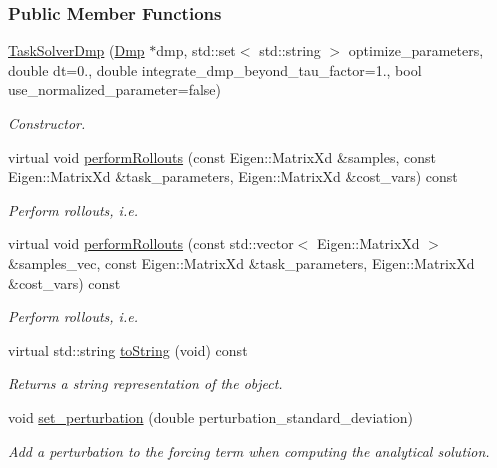 \subsubsection*{Public Member Functions}
\begin{DoxyCompactItemize}
\item 
\hyperlink{classDmpBbo_1_1TaskSolverDmp_a9038769df4b3b779070d4453dba1e2e8}{Task\+Solver\+Dmp} (\hyperlink{classDmpBbo_1_1Dmp}{Dmp} $\ast$dmp, std\+::set$<$ std\+::string $>$ optimize\+\_\+parameters, double dt=0., double integrate\+\_\+dmp\+\_\+beyond\+\_\+tau\+\_\+factor=1., bool use\+\_\+normalized\+\_\+parameter=false)
\begin{DoxyCompactList}\small\item\em Constructor. \end{DoxyCompactList}\item 
virtual void \hyperlink{classDmpBbo_1_1TaskSolverDmp_a1bfa5f861b08d1073a5c4461aefd7e57}{perform\+Rollouts} (const Eigen\+::\+Matrix\+Xd \&samples, const Eigen\+::\+Matrix\+Xd \&task\+\_\+parameters, Eigen\+::\+Matrix\+Xd \&cost\+\_\+vars) const 
\begin{DoxyCompactList}\small\item\em Perform rollouts, i.\+e. \end{DoxyCompactList}\item 
virtual void \hyperlink{classDmpBbo_1_1TaskSolverDmp_aef8605bc2d34bea9994507202e0368c2}{perform\+Rollouts} (const std\+::vector$<$ Eigen\+::\+Matrix\+Xd $>$ \&samples\+\_\+vec, const Eigen\+::\+Matrix\+Xd \&task\+\_\+parameters, Eigen\+::\+Matrix\+Xd \&cost\+\_\+vars) const 
\begin{DoxyCompactList}\small\item\em Perform rollouts, i.\+e. \end{DoxyCompactList}\item 
virtual std\+::string \hyperlink{classDmpBbo_1_1TaskSolverDmp_a1aca816b42cf0d36118be0ab91120d77}{to\+String} (void) const 
\begin{DoxyCompactList}\small\item\em Returns a string representation of the object. \end{DoxyCompactList}\item 
void \hyperlink{classDmpBbo_1_1TaskSolverDmp_a8abd9d1a1f4d871e203818298b37dc3c}{set\+\_\+perturbation} (double perturbation\+\_\+standard\+\_\+deviation)
\begin{DoxyCompactList}\small\item\em Add a perturbation to the forcing term when computing the analytical solution. \end{DoxyCompactList}\end{DoxyCompactItemize}

